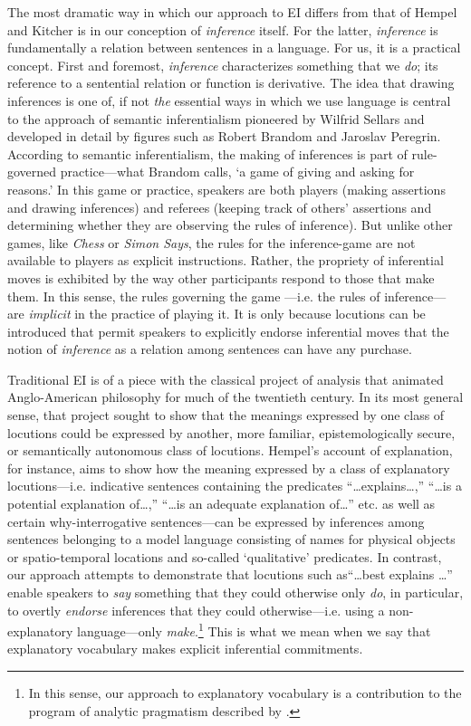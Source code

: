 \documentclass{svjour3}                     %
\begin{document}
The most dramatic way in which our approach to EI differs from that of Hempel and Kitcher is in our conception of \textit{inference} itself. For the latter, \textit{inference} is fundamentally a relation between sentences in a language. For us, it is a  practical concept. First and foremost, \textit{inference} characterizes something that we \textit{do}; its reference to a sentential relation or function is derivative. The idea that drawing inferences is one of, if not \textit{the} essential ways in which we use language is central to the approach of semantic inferentialism pioneered by Wilfrid Sellars and developed in detail by figures such as Robert Brandom and Jaroslav Peregrin. According to semantic inferentialism, the making of inferences is part of rule-governed practice---what Brandom calls, `a game of giving and asking for reasons.' In this game or practice, speakers are both players (making assertions and drawing inferences) and referees (keeping track of others' assertions and determining whether they are observing the rules of inference). But unlike other games, like \textit{Chess} or \textit{Simon Says}, the rules for the inference-game are not available to players as explicit instructions. Rather, the propriety of inferential moves is exhibited by the way other participants respond to those that make them. In this sense, the rules governing the game ---i.e. the rules of inference--- are \textit{implicit} in the practice of playing it. It is only because locutions can be introduced that permit speakers to explicitly endorse inferential moves that the notion of \textit{inference} as a relation among sentences can have any purchase.

Traditional EI is of a piece with the classical project of analysis that animated Anglo-American philosophy for much of the twentieth century. In its most general sense, that project sought to show that the meanings expressed by one class of locutions could be expressed by another, more familiar, epistemologically secure, or semantically autonomous class of locutions. Hempel's account of explanation, for instance, aims to show how the meaning expressed by a class of explanatory locutions---i.e. indicative sentences containing the predicates ``\ldots explains\ldots,'' ``\ldots is a potential explanation of\ldots,'' ``\ldots is an adequate explanation of\ldots'' etc. as well as certain why-interrogative sentences---can be expressed by inferences among sentences belonging to a model language consisting of names for physical objects or spatio-temporal locations and so-called `qualitative' predicates. In contrast, our approach attempts to demonstrate that locutions such as``\ldots best explains \ldots'' enable speakers to \textit{say} something that they could otherwise only \textit{do}, in particular, to overtly \textit{endorse} inferences that they could otherwise---i.e. using a non-explanatory language---only \textit{make}.\footnote{In this sense, our approach to explanatory vocabulary is a contribution to the program of analytic pragmatism described by \cite{Brandom2008}. } This is what we mean when we say that explanatory vocabulary makes explicit inferential commitments.
\end{document}
